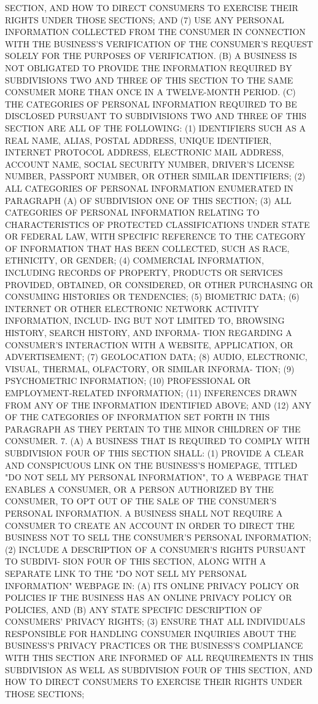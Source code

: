  SECTION, AND HOW TO DIRECT CONSUMERS  TO  EXERCISE  THEIR  RIGHTS  UNDER
 THOSE SECTIONS; AND
   (7)  USE  ANY  PERSONAL  INFORMATION  COLLECTED  FROM  THE CONSUMER IN
 CONNECTION WITH THE BUSINESS'S VERIFICATION OF  THE  CONSUMER'S  REQUEST
 SOLELY FOR THE PURPOSES OF VERIFICATION.
   (B) A BUSINESS IS NOT OBLIGATED TO PROVIDE THE INFORMATION REQUIRED BY
 SUBDIVISIONS  TWO  AND  THREE  OF THIS SECTION TO THE SAME CONSUMER MORE
 THAN ONCE IN A TWELVE-MONTH PERIOD.
   (C) THE CATEGORIES OF PERSONAL INFORMATION REQUIRED  TO  BE  DISCLOSED
 PURSUANT  TO  SUBDIVISIONS  TWO AND THREE OF THIS SECTION ARE ALL OF THE
 FOLLOWING:
   (1) IDENTIFIERS SUCH AS A REAL NAME,  ALIAS,  POSTAL  ADDRESS,  UNIQUE
 IDENTIFIER,  INTERNET PROTOCOL ADDRESS, ELECTRONIC MAIL ADDRESS, ACCOUNT
 NAME, SOCIAL SECURITY NUMBER, DRIVER'S LICENSE NUMBER, PASSPORT  NUMBER,
 OR OTHER SIMILAR IDENTIFIERS;
   (2) ALL CATEGORIES OF PERSONAL INFORMATION ENUMERATED IN PARAGRAPH (A)
 OF SUBDIVISION ONE OF THIS SECTION;
   (3) ALL CATEGORIES OF PERSONAL INFORMATION RELATING TO CHARACTERISTICS
 OF  PROTECTED  CLASSIFICATIONS UNDER STATE OR FEDERAL LAW, WITH SPECIFIC
 REFERENCE TO THE CATEGORY OF INFORMATION THAT HAS BEEN  COLLECTED,  SUCH
 AS RACE, ETHNICITY, OR GENDER;
   (4) COMMERCIAL INFORMATION, INCLUDING RECORDS OF PROPERTY, PRODUCTS OR
 SERVICES  PROVIDED,  OBTAINED,  OR  CONSIDERED,  OR  OTHER PURCHASING OR
 CONSUMING HISTORIES OR TENDENCIES;
   (5) BIOMETRIC DATA;
   (6) INTERNET OR OTHER ELECTRONIC NETWORK ACTIVITY INFORMATION, INCLUD-
 ING BUT NOT LIMITED TO, BROWSING HISTORY, SEARCH HISTORY,  AND  INFORMA-
 TION  REGARDING A CONSUMER'S INTERACTION WITH A WEBSITE, APPLICATION, OR
 ADVERTISEMENT;
   (7) GEOLOCATION DATA;
   (8) AUDIO, ELECTRONIC, VISUAL, THERMAL, OLFACTORY, OR SIMILAR INFORMA-
 TION;
   (9) PSYCHOMETRIC INFORMATION;
   (10) PROFESSIONAL OR EMPLOYMENT-RELATED INFORMATION;
   (11) INFERENCES DRAWN FROM ANY OF THE  INFORMATION  IDENTIFIED  ABOVE;
 AND
   (12)  ANY OF THE CATEGORIES OF INFORMATION SET FORTH IN THIS PARAGRAPH
 AS THEY PERTAIN TO THE MINOR CHILDREN OF THE CONSUMER.
   7. (A) A BUSINESS THAT IS REQUIRED TO COMPLY WITH SUBDIVISION FOUR  OF
 THIS SECTION SHALL:
   (1)  PROVIDE  A CLEAR AND CONSPICUOUS LINK ON THE BUSINESS'S HOMEPAGE,
 TITLED "DO NOT SELL MY PERSONAL INFORMATION", TO A WEBPAGE THAT  ENABLES
 A  CONSUMER,  OR  A PERSON AUTHORIZED BY THE CONSUMER, TO OPT OUT OF THE
 SALE OF THE  CONSUMER'S  PERSONAL  INFORMATION.  A  BUSINESS  SHALL  NOT
 REQUIRE  A CONSUMER TO CREATE AN ACCOUNT IN ORDER TO DIRECT THE BUSINESS
 NOT TO SELL THE CONSUMER'S PERSONAL INFORMATION;
   (2) INCLUDE A DESCRIPTION OF A CONSUMER'S RIGHTS PURSUANT TO  SUBDIVI-
 SION  FOUR  OF  THIS  SECTION, ALONG WITH A SEPARATE LINK TO THE "DO NOT
 SELL MY PERSONAL INFORMATION" WEBPAGE IN: (A) ITS ONLINE PRIVACY  POLICY
 OR  POLICIES  IF  THE BUSINESS HAS AN ONLINE PRIVACY POLICY OR POLICIES,
 AND (B) ANY STATE SPECIFIC DESCRIPTION OF CONSUMERS' PRIVACY RIGHTS;
   (3) ENSURE THAT ALL  INDIVIDUALS  RESPONSIBLE  FOR  HANDLING  CONSUMER
 INQUIRIES  ABOUT  THE  BUSINESS'S  PRIVACY  PRACTICES  OR THE BUSINESS'S
 COMPLIANCE WITH THIS SECTION ARE INFORMED OF ALL  REQUIREMENTS  IN  THIS
 SUBDIVISION  AS  WELL  AS  SUBDIVISION  FOUR OF THIS SECTION, AND HOW TO
 DIRECT CONSUMERS TO EXERCISE THEIR RIGHTS UNDER THOSE SECTIONS;

